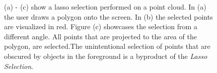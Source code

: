 \begin{figure}
\centering
{}\par\medskip
{}\par\medskip        
{}
	
\caption{(a) - (c) show a lasso selection performed on a point cloud. In (a) the user draws a polygon onto the screen. In (b) the selected points are visualized in red. Figure (c) showcases the selection from a different angle. All points that are projected to the area of the polygon, are selected.The unintentional selection of points that are obscured by objects in the foreground is a byproduct of the \textit{Lasso Selection}. }
\label{fig:lasso}
\end{figure}


